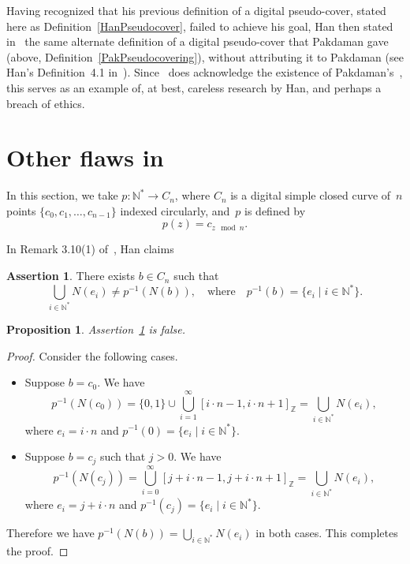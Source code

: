 \documentclass{article} \UseRawInputEncoding
\theoremstyle{plain}
\newtheorem{prop}[thm]{Proposition}
\theoremstyle{definition}
\newtheorem{assert}[thm]{Assertion}
\numberwithin{thm}{section}
\def\Z{{\mathbb Z}}
\def\N{{\mathbb N}}
\begin{document}
Having recognized that his previous definition of a digital pseudo-cover, stated here as Definition~\ref{HanPseudocover}, failed to achieve his goal, Han then stated
in~\cite{HanCorrig} the same alternate definition of a digital pseudo-cover 
that Pakdaman gave (above, Definition~\ref{PakPseudocovering}), without attributing it
to Pakdaman (see Han's Definition~4.1 in~\cite{HanCorrig}). Since~\cite{HanCorrig}
does acknowledge the existence of Pakdaman's~\cite{Pak22}, this serves as an
example of, at best, careless research by Han, and perhaps a breach of ethics.

\section{Other flaws in \cite{HanCorrig}}
In this section, we take $p: \N^* \to C_n$, where $C_n$ is a digital
simple closed curve of~$n$ points $\{c_0, c_1, \ldots, c_{n-1} \}$ indexed
circularly, and~$p$ is defined by
\[ p(z) = c_{z \! \! \mod n}.\]

In Remark 3.10(1) of~\cite{HanCorrig}, Han claims

\begin{assert}
    \label{Han3.10-1}
    There exists $b \in C_n$ such that
    \[ \bigcup_{i \in \N^*} N(e_i) \neq p^{-1}(N(b)), ~~~ \mbox{ where } ~~~
       p^{-1}(b) = \{ e_i \mid i \in \N^* \}.
    \]
\end{assert}

\begin{prop}
    \label{Han3.10False}
    Assertion~\ref{Han3.10-1} is false.
\end{prop}

\begin{proof}
Consider the following cases.
   \begin{itemize}
        \item Suppose $b=c_0$. We have 
             \[ p^{-1}(N(c_0)) = \{0,1 \} \cup \bigcup_{i=1}^{\infty} [i \cdot n -1, i \cdot n+1]_{\Z}
                = \bigcup_{i \in \N^*} N(e_i),
             \]
             where $e_i = i \cdot n$ and $p^{-1}(0) = \{ e_i \mid i \in \N^* \}$.
        \item Suppose $b=c_j$ such that $j > 0$. We have 
             \[ p^{-1}(N(c_j)) = \bigcup_{i=0}^{\infty} [j + i \cdot n -1, j + i \cdot n+1]_{\Z}
                = \bigcup_{i \in \N^*} N(e_i),
             \]
             where $e_i = j + i \cdot n$ and $p^{-1}(c_j) = \{ e_i \mid i \in \N^* \}$.
    \end{itemize}
    Therefore we have  $p^{-1}(N(b)) = \bigcup_{i \in \N^*} N(e_i)$ in both
    cases. This completes the proof.
\end{proof}
\end{document}
